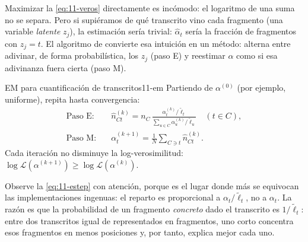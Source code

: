 Maximizar la \cref{eq:11-veros} directamente es incómodo: el logaritmo de una suma no se separa. Pero si supiéramos de qué transcrito vino cada fragmento (una variable \emph{latente} $z_j$), la estimación sería trivial: $\hat\alpha_t$ sería la fracción de fragmentos con $z_j=t$. El algoritmo  de \textcite{c11-dempster1977} convierte esa intuición en un método: alterna entre adivinar, de forma probabilística, los $z_j$ (paso E) y reestimar $\alpha$ como si esa adivinanza fuera cierta (paso M).

\begin{teorema}{EM para cuantificación de transcritos}{11-em}
Partiendo de $\alpha^{(0)}$ (por ejemplo, uniforme), repita hasta convergencia:
\begin{align}
\text{Paso E:}\quad & \hat n_{Ct}^{(k)} = n_C\,\frac{\alpha_t^{(k)}/\tilde\ell_t}{\sum_{u\in C}\alpha_u^{(k)}/\tilde\ell_u}\quad (t\in C),\label{eq:11-estep}\\[2pt]
\text{Paso M:}\quad & \alpha_t^{(k+1)} = \frac{1}{N}\sum_{C\ni t}\hat n_{Ct}^{(k)}.\label{eq:11-mstep}
\end{align}
Cada iteración no disminuye la log-verosimilitud: $\log\mathcal L(\alpha^{(k+1)})\ge\log\mathcal L(\alpha^{(k)})$.
\end{teorema}

\begin{simbolos}
\end{simbolos}

Observe la \cref{eq:11-estep} con atención, porque es el lugar donde más se equivocan las implementaciones ingenuas: el reparto es proporcional a $\alpha_t/\tilde\ell_t$, no a $\alpha_t$. La razón es que la probabilidad de un fragmento \emph{concreto} dado el transcrito es $1/\tilde\ell_t$: entre dos transcritos igual de representados en fragmentos, uno corto concentra esos fragmentos en menos posiciones y, por tanto, explica mejor cada uno.

